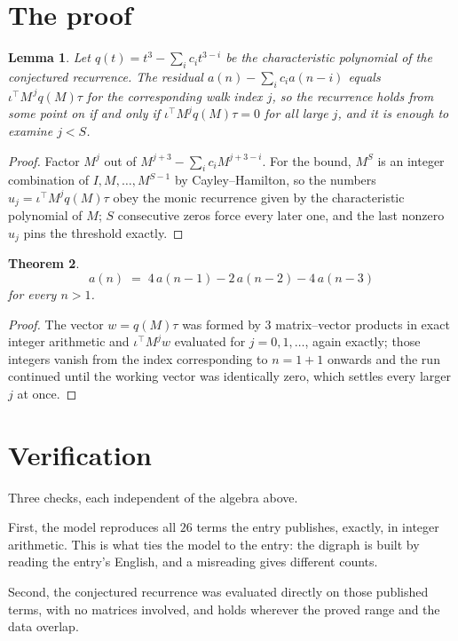 \documentclass[11pt,a4paper]{article}
\theoremstyle{plain}
\newtheorem{theorem}{Theorem}
\newtheorem{lemma}[theorem]{Lemma}
\theoremstyle{definition}
\begin{document}
\section{The proof}

\begin{lemma}\label{lem:crit}
Let $q(t)=t^{3}-\sum_i c_it^{3-i}$ be the characteristic polynomial of the
conjectured recurrence. The residual $a(n)-\sum_ic_ia(n-i)$ equals
$\iota^{\!\top}M^{\,j}q(M)\tau$ for the corresponding walk index $j$, so the recurrence
holds from some point on if and only if $\iota^{\!\top}M^{j}q(M)\tau=0$ for all large $j$,
and it is enough to examine $j<S$.
\end{lemma}

\begin{proof}
Factor $M^{j}$ out of $M^{j+3}-\sum_ic_iM^{j+3-i}$. For the bound, $M^{S}$
is an integer combination of $I,M,\dots,M^{S-1}$ by Cayley--Hamilton, so the numbers
$u_j=\iota^{\!\top}M^{j}q(M)\tau$ obey the monic recurrence given by the characteristic
polynomial of $M$; $S$ consecutive zeros force every later one, and the last nonzero $u_j$
pins the threshold exactly.
\end{proof}

\begin{theorem}
\[
a(n)\;=\;4\,a(n-1) - 2\,a(n-2) - 4\,a(n-3)
\]
for every $n>1$.
\end{theorem}

\begin{proof}
The vector $w=q(M)\tau$ was formed by $3$ matrix--vector products in exact integer
arithmetic and $\iota^{\!\top}M^{j}w$ evaluated for $j=0,1,\dots$, again exactly; those
integers vanish from the index corresponding to $n=1+1$ onwards and the run continued
until the working vector was identically zero, which settles every larger $j$ at once.
\end{proof}

\section{Verification}

Three checks, each independent of the algebra above.

First, the model reproduces all $26$ terms the entry publishes, exactly, in integer
arithmetic. This is what ties the model to the entry: the digraph is built by reading the
entry's English, and a misreading gives different counts.

Second, the conjectured recurrence was evaluated directly on those published terms, with no
matrices involved, and holds wherever the proved range and the data overlap.
\end{document}
